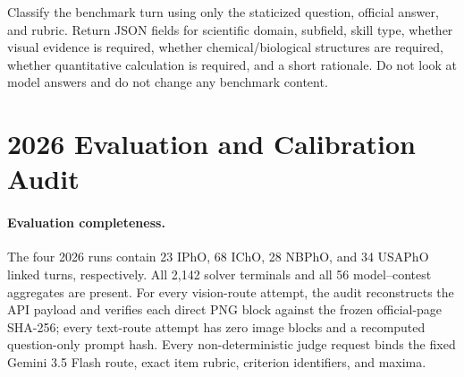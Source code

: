 \documentclass[11pt]{article}
\begin{document}
\begin{tcolorbox}[
  title={Subfield and modality classification prompt},
  colback=gray!3,
  colframe=black!35,
  boxrule=0.6pt,
  arc=1.5mm,
  left=1.5mm,right=1.5mm,top=1mm,bottom=1mm
]
\footnotesize
Classify the benchmark turn using only the staticized question, official answer, and rubric.
Return JSON fields for scientific domain, subfield, skill type, whether visual evidence is required, whether chemical/biological structures are required, whether quantitative calculation is required, and a short rationale.
Do not look at model answers and do not change any benchmark content.
\end{tcolorbox}

\section{2026 Evaluation and Calibration Audit}
\label{app:fresh-audit}

\paragraph{Evaluation completeness.}
The four 2026 runs contain 23 IPhO, 68 IChO, 28 NBPhO, and 34 USAPhO linked turns, respectively.
All 2,142 solver terminals and all 56 model--contest aggregates are present.
For every vision-route attempt, the audit reconstructs the API payload and verifies each direct PNG block against the frozen official-page SHA-256; every text-route attempt has zero image blocks and a recomputed question-only prompt hash.
Every non-deterministic judge request binds the fixed Gemini 3.5 Flash route, exact item rubric, criterion identifiers, and maxima.
\end{document}
